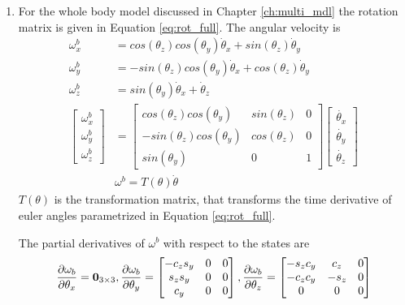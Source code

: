 \begin{enumerate}
\item For the whole body model discussed in Chapter \ref{ch:multi_mdl} the rotation matrix is given in Equation \ref{eq:rot_full}. The angular velocity is
\begin{equation}
	\begin{split}
	\omega_x^b &= cos(\theta_z)cos(\theta_y)\dot{\theta}_x + sin(\theta_z)\dot{\theta}_y \\
	\omega_y^b &= - sin(\theta_z)cos(\theta_y)\dot{\theta}_x + cos(\theta_z)\dot{\theta}_y \\
	\omega_z^b &= sin(\theta_y)\dot{\theta}_x + \dot{\theta}_z \\
	\begin{bmatrix}
	\omega_x^b\\ \omega_y^b\\ \omega_z^b
	\end{bmatrix}
	 &= 
	\begin{bmatrix}
		cos(\theta_z)cos(\theta_y) &sin(\theta_z) &0 \\
	 	-sin(\theta_z)cos(\theta_y) &cos(\theta_z) &0 \\
		sin(\theta_y) &0 &1
	\end{bmatrix}
	\begin{bmatrix}
			\dot{\theta_x} \\ \dot{\theta_y}\\ \dot{\theta_z}
	\end{bmatrix}\\
	& \omega^b = T(\theta) \dot{\theta}
	\end{split}
\end{equation}
$T(\theta)$ is the transformation matrix, that transforms the time derivative of euler angles parametrized in Equation \ref{eq:rot_full}.

The partial derivatives of $\omega^b$ with respect to the states are
$$\frac{\partial {\omega_b}}{\partial {\theta_x}} = \textbf{0}_{3\times 3},\frac{\partial {\omega_b}}{\partial {\theta_y}} = \begin{bmatrix}	-c_zs_y &0 &0\\ s_zs_y &0 &0\\ c_y &0 &0 \end{bmatrix}, \frac{\partial {\omega_b}}{\partial {\theta_z}} = \begin{bmatrix}	-s_zc_y &c_z &0\\ -c_zc_y &-s_z &0\\ 0 &0 &0 \end{bmatrix} $$


\end{enumerate}
